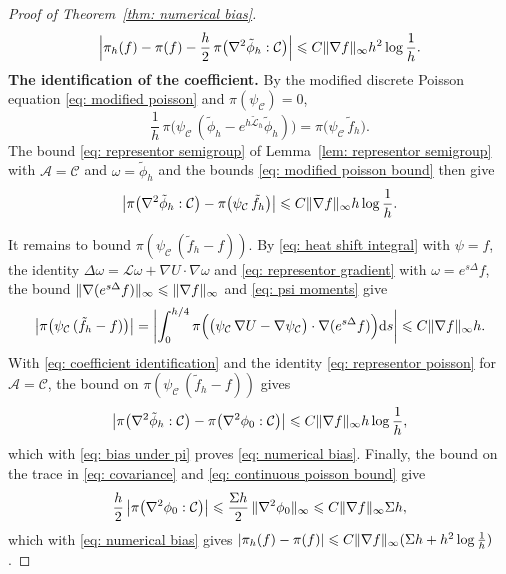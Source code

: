 \begin{proof}[Proof of Theorem~\ref{thm: numerical bias}]
\begin{equation}
        \Bigl| \pi_h(f) - \pi(f) - \frac h2\, \pi\bigl( \nabla^2 \tilde\phi_h : \mathcal C \bigr) \Bigr| \leqslant C \lVert \nabla f \rVert_\infty h^2 \log\frac1h .
        \label{eq: bias under pi}
    \end{equation}
    \textbf{The identification of the coefficient.} By the modified discrete Poisson equation \eqref{eq: modified poisson} and $\pi(\psi_{\mathcal C}) = 0$,
    \begin{equation*}
        \frac1h\, \pi\bigl( \psi_{\mathcal C}\, ( \tilde\phi_h - e^{h\tilde{\mathcal L}_h} \tilde\phi_h ) \bigr) = \pi\bigl( \psi_{\mathcal C}\, \tilde f_h \bigr) .
    \end{equation*}
    The bound \eqref{eq: representor semigroup} of Lemma~\ref{lem: representor semigroup} with $\mathcal A = \mathcal C$ and $\omega = \tilde\phi_h$ and the bounds \eqref{eq: modified poisson bound} then give
    \begin{equation}
        \bigl| \pi\bigl( \nabla^2 \tilde\phi_h : \mathcal C \bigr) - \pi\bigl( \psi_{\mathcal C}\, \tilde f_h \bigr) \bigr| \leqslant C \lVert \nabla f \rVert_\infty h \log\frac1h .
        \label{eq: coefficient identification}
    \end{equation}

    It remains to bound $\pi( \psi_{\mathcal C}\, ( \tilde f_h - f ) )$. By \eqref{eq: heat shift integral} with $\psi = f$, the identity $\Delta \omega = \mathcal L \omega + \nabla U \cdot \nabla \omega$ and \eqref{eq: representor gradient} with $\omega = e^{s\Delta} f$, the bound $\lVert \nabla ( e^{s\Delta} f ) \rVert_\infty \leqslant \lVert \nabla f \rVert_\infty$ and \eqref{eq: psi moments} give
    \begin{equation*}
        \bigl| \pi\bigl( \psi_{\mathcal C}\, ( \tilde f_h - f ) \bigr) \bigr| = \biggl| \int_0^{h/4} \pi\Bigl( \bigl( \psi_{\mathcal C}\, \nabla U - \nabla \psi_{\mathcal C} \bigr) \cdot \nabla ( e^{s\Delta} f ) \Bigr) \mathrm{d} s \biggr| \leqslant C \lVert \nabla f \rVert_\infty h .
    \end{equation*}
    With \eqref{eq: coefficient identification} and the identity \eqref{eq: representor poisson} for $\mathcal A = \mathcal C$, the bound on $\pi( \psi_{\mathcal C}\, ( \tilde f_h - f ) )$ gives
    \begin{equation*}
        \bigl| \pi\bigl( \nabla^2 \tilde\phi_h : \mathcal C \bigr) - \pi\bigl( \nabla^2 \phi_0 : \mathcal C \bigr) \bigr| \leqslant C \lVert \nabla f \rVert_\infty h \log\frac1h ,
    \end{equation*}
    which with \eqref{eq: bias under pi} proves \eqref{eq: numerical bias}. Finally, the bound on the trace in \eqref{eq: covariance} and \eqref{eq: continuous poisson bound} give
    \begin{equation*}
        \frac h2\, \bigl| \pi\bigl( \nabla^2 \phi_0 : \mathcal C \bigr) \bigr| \leqslant \frac{\Sigma h}{2}\, \lVert \nabla^2 \phi_0 \rVert_\infty \leqslant C \lVert \nabla f \rVert_\infty \Sigma h ,
    \end{equation*}
    which with \eqref{eq: numerical bias} gives $|\pi_h(f) - \pi(f)| \leqslant C \lVert \nabla f \rVert_\infty ( \Sigma h + h^2 \log\frac1h )$.
\end{proof}

